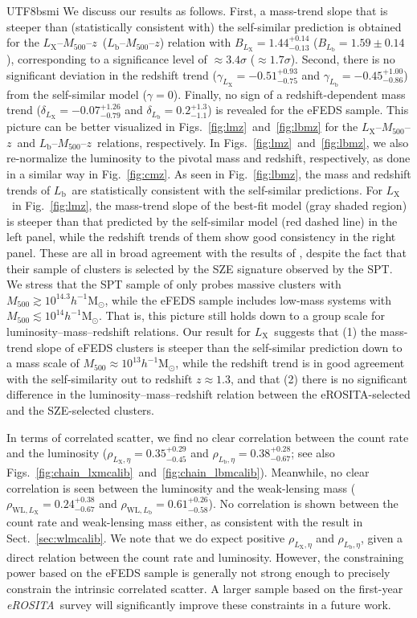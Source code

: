 \documentclass[longauth]{aa}
\newcommand{\Msunh}{\ensuremath{h^{-1}\mathrm{M}_{\odot}}}
\newcommand{\Mfiveoo}{\ensuremath{M_{500}}}
\newcommand{\redshift}{\ensuremath{z}}
\newcommand{\eROSITA}{\emph{eROSITA}}
\newcommand{\Lx}{\ensuremath{L_{\mathrm{X}}}}
\newcommand{\Lb}{\ensuremath{L_{\mathrm{b}}}}
\newcommand{\rate}{\ensuremath{\eta}}
\newcommand{\Blx}{\ensuremath{B_{L_{\mathrm{X}}}}}
\newcommand{\deltalx}{\ensuremath{\delta_{L_{\mathrm{X}}}}}
\newcommand{\gammalx}{\ensuremath{\gamma_{L_{\mathrm{X}}}}}
\newcommand{\Blb}{\ensuremath{B_{L_{\mathrm{b}}}}}
\newcommand{\deltalb}{\ensuremath{\delta_{L_{\mathrm{b}}}}}
\newcommand{\gammalb}{\ensuremath{\gamma_{L_{\mathrm{b}}}}}
\newcommand{\ansBlx}{\ensuremath{ 1.44^{+0.14}_{-0.13} }}
\newcommand{\ansdeltalx}{\ensuremath{ -0.07^{+1.26}_{-0.79} }}
\newcommand{\ansgammalx}{\ensuremath{ -0.51^{+0.93}_{-0.75} }}
\newcommand{\ansrhowllx}{\ensuremath{ 0.24^{+0.38}_{-0.67} }}
\newcommand{\ansrholxeta}{\ensuremath{ 0.35^{+0.29}_{-0.45}  }}
\newcommand{\ansBlb}{\ensuremath{ 1.59\pm 0.14 }}
\newcommand{\ansdeltalb}{\ensuremath{ 0.2^{+1.3}_{-1.1} }}
\newcommand{\ansgammalb}{\ensuremath{ -0.45^{+1.00}_{-0.86} }}
\newcommand{\ansrhowllb}{\ensuremath{ 0.61^{+0.26}_{-0.58} }}
\newcommand{\ansrholbeta}{\ensuremath{ 0.38^{+0.28}_{-0.67}  }}
\begin{document}
\begin{CJK*}{UTF8}{bsmi}
We discuss our results as follows.
First, a mass-trend slope that is steeper than (statistically consistent with) the self-similar prediction is obtained for the \Lx--\Mfiveoo--\redshift\ (\Lb--\Mfiveoo--\redshift) relation with $\Blx = \ansBlx$ ($\Blb = \ansBlb$), 
corresponding to a significance level of 
$\approx3.4\sigma$ ($\approx1.7\sigma$).
Second, there is no significant deviation in the redshift trend ($\gammalx = \ansgammalx$ and $\gammalb = \ansgammalb$) from the self-similar model ($\gamma = 0$).
Finally, no sign of a redshift-dependent mass trend ($\deltalx = \ansdeltalx$ and $\deltalb = \ansdeltalb$) is revealed for the eFEDS sample.
This picture can be better visualized in Figs.~\ref{fig:lmz}~and~\ref{fig:lbmz} for the  \Lx--\Mfiveoo--\redshift\ and \Lb--\Mfiveoo--\redshift\ relations, respectively.
In Figs.~\ref{fig:lmz}~and~\ref{fig:lbmz}, we also re-normalize the luminosity to the pivotal mass and redshift, respectively, as done in a similar way in Fig.~\ref{fig:cmz}. 
As seen in Fig.~\ref{fig:lbmz}, the mass and redshift trends of \Lb\ are statistically consistent with the self-similar predictions.
For \Lx\ in Fig.~\ref{fig:lmz}, the mass-trend slope of the best-fit model (gray shaded region) is steeper than that predicted by the self-similar model (red dashed line) in the left panel, while the redshift trends of them show good consistency
in the right panel.
These are all in broad agreement with the results of \cite{bulbul19}, despite the fact that their sample of clusters is selected by the SZE signature observed by the SPT.
We stress that the SPT sample of \cite{bulbul19} only probes massive clusters with $\Mfiveoo\gtrsim10^{14.3}\Msunh$, while the eFEDS sample includes low-mass systems with $\Mfiveoo\lesssim10^{14}\Msunh$.
That is, this picture still holds down to a group scale for luminosity--mass--redshift relations.
Our result for \Lx\ suggests that (1) the mass-trend slope of eFEDS clusters is steeper than the self-similar prediction down to a mass scale of $\Mfiveoo\approx10^{13}\Msunh$, while the redshift trend is in good agreement with the self-similarity out to redshift $\redshift\approx1.3$, and that (2) there is no significant difference in the luminosity--mass--redshift relation between the eROSITA-selected and the SZE-selected clusters.

In terms of correlated scatter, we find no clear correlation between the count rate and the luminosity ($\rho_{\Lx,\rate}=\ansrholxeta$ and $\rho_{\Lb,\rate}=\ansrholbeta$; see also Figs.~\ref{fig:chain_lxmcalib}~and~\ref{fig:chain_lbmcalib}).
Meanwhile, no clear correlation is seen between the luminosity and the weak-lensing mass ($\rho_{\mathrm{WL},\Lx} = \ansrhowllx$ and $\rho_{\mathrm{WL},\Lb} = \ansrhowllb$).
No correlation is shown between the count rate and weak-lensing mass either, as consistent with the result in Sect.~\ref{sec:wlmcalib}.
We note that we do expect positive $\rho_{\Lx,\rate}$ and $\rho_{\Lb,\rate}$, given a direct relation between the count rate and luminosity.
However, the constraining power based on the eFEDS sample is generally not strong enough to precisely constrain the intrinsic correlated scatter.
A larger sample based on the first-year \eROSITA\ survey will significantly improve these constraints in a future work.


\end{CJK*}
\end{document}
